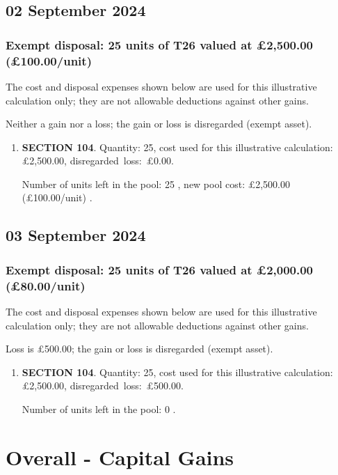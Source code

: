 \documentclass{article}
\begin{document}
\subsection*{02 September 2024}
\subsubsection*{
    Exempt disposal: 25 units of T26 valued at £2,500.00
    (£100.00/unit)%
}
The cost and disposal expenses shown below are used for this illustrative calculation only;
they are not allowable deductions against other gains.

Neither a gain nor a loss; the gain or loss is disregarded (exempt asset).

\begin{enumerate}
\item \textbf{SECTION 104}. Quantity: 25,
    cost used for this illustrative
    calculation:
    £2,500.00,
    \mbox{disregarded loss: £0.00.}

    Number of units left in the pool:
    25%
,
    new pool cost: £2,500.00
    (£100.00/unit)%
.

\end{enumerate}



\subsection*{03 September 2024}
\subsubsection*{
    Exempt disposal: 25 units of T26 valued at £2,000.00
    (£80.00/unit)%
}
The cost and disposal expenses shown below are used for this illustrative calculation only;
they are not allowable deductions against other gains.

Loss is £500.00; the gain or loss is disregarded (exempt asset).

\begin{enumerate}
\item \textbf{SECTION 104}. Quantity: 25,
    cost used for this illustrative
    calculation:
    £2,500.00,
    \mbox{disregarded loss: £500.00.}

    Number of units left in the pool:
    0%
.

\end{enumerate}




\clearpage
\section*{Overall - Capital Gains}
\end{document}
